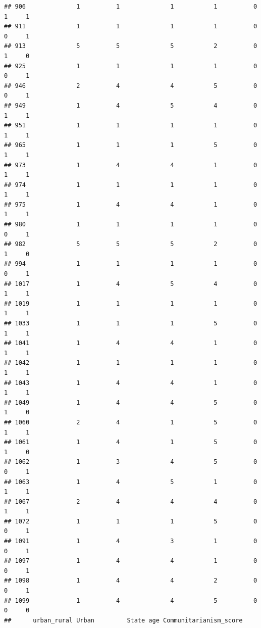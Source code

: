 \documentclass[
]{article}
\begin{document}
\begin{verbatim}
## 906              1          1              1           1          0    1     1
## 911              1          1              1           1          0    0     1
## 913              5          5              5           2          0    1     0
## 925              1          1              1           1          0    0     1
## 946              2          4              4           5          0    0     1
## 949              1          4              5           4          0    1     1
## 951              1          1              1           1          0    1     1
## 965              1          1              1           5          0    1     1
## 973              1          4              4           1          0    1     1
## 974              1          1              1           1          0    1     1
## 975              1          4              4           1          0    1     1
## 980              1          1              1           1          0    0     1
## 982              5          5              5           2          0    1     0
## 994              1          1              1           1          0    0     1
## 1017             1          4              5           4          0    1     1
## 1019             1          1              1           1          0    1     1
## 1033             1          1              1           5          0    1     1
## 1041             1          4              4           1          0    1     1
## 1042             1          1              1           1          0    1     1
## 1043             1          4              4           1          0    1     1
## 1049             1          4              4           5          0    1     0
## 1060             2          4              1           5          0    1     1
## 1061             1          4              1           5          0    1     0
## 1062             1          3              4           5          0    0     1
## 1063             1          4              5           1          0    1     1
## 1067             2          4              4           4          0    1     1
## 1072             1          1              1           5          0    0     1
## 1091             1          4              3           1          0    0     1
## 1097             1          4              4           1          0    0     1
## 1098             1          4              4           2          0    0     1
## 1099             1          4              4           5          0    0     0
##      urban_rural Urban         State age Communitarianism_score

\end{verbatim}
\end{document}
